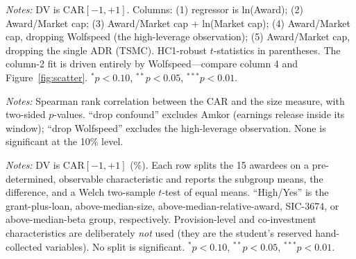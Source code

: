 \documentclass[12pt]{article}
\begin{document}
\begin{table}[htbp]\centering
\begin{threeparttable}
\caption{Cross-sectional regressions: does the reaction scale with award size?}\label{tab:crosssec}\footnotesize

\begin{tablenotes}\small\item \textit{Notes:} DV is CAR$[-1,+1]$. Columns:
(1) regressor is ln(Award); (2) Award/Market cap; (3) Award/Market cap $+$ ln(Market cap);
(4) Award/Market cap, dropping Wolfspeed (the high-leverage observation); (5) Award/Market
cap, dropping the single ADR (TSMC). HC1-robust $t$-statistics in parentheses. The column-2
fit is driven entirely by Wolfspeed---compare column 4 and Figure~\ref{fig:scatter}.
$^{*}p<0.10$, $^{**}p<0.05$, $^{***}p<0.01$.
\end{tablenotes}
\end{threeparttable}
\end{table}

\begin{table}[htbp]\centering
\begin{threeparttable}
\caption{Outlier-robust Spearman rank correlations}\label{tab:robust}\small

\begin{tablenotes}\small\item \textit{Notes:} Spearman rank correlation between the CAR and
the size measure, with two-sided $p$-values. ``drop confound'' excludes Amkor (earnings
release inside its window); ``drop Wolfspeed'' excludes the high-leverage observation.
None is significant at the 10\% level.
\end{tablenotes}
\end{threeparttable}
\end{table}

\begin{table}[htbp]\centering
\begin{threeparttable}
\caption{Heterogeneity of the announcement CAR by observable characteristics}\label{tab:hetero}\small

\begin{tablenotes}\small\item \textit{Notes:} DV is CAR$[-1,+1]$ (\%). Each row splits the 15
awardees on a pre-determined, observable characteristic and reports the subgroup means, the
difference, and a Welch two-sample $t$-test of equal means. ``High/Yes'' is the grant-plus-loan,
above-median-size, above-median-relative-award, SIC-3674, or above-median-beta group,
respectively. Provision-level and co-investment characteristics are deliberately \emph{not} used
(they are the student's reserved hand-collected variables). No split is significant.
$^{*}p<0.10$, $^{**}p<0.05$, $^{***}p<0.01$.
\end{tablenotes}
\end{threeparttable}
\end{table}
\end{document}
